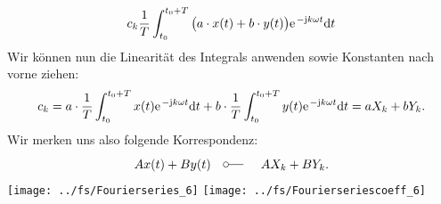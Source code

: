 \documentclass[11pt,a4paper,DIV=12]{scrartcl}
\newcommand{\diff}{\mathrm{d}}
\begin{document}
\begin{align}
	c_k\frac{1}{T}\int_{t_0}^{t_0+T}\big (a\cdot x(t)+b\cdot y(t)\big )\e^{-\im k \omega t}\diff t
\end{align}
Wir können nun die Linearität des Integrals anwenden sowie Konstanten nach vorne ziehen:
\begin{align}
	c_k=a\cdot\frac{1}{T}\int_{t_0}^{t_0+T}x(t)\e^{-\im k \omega t}\diff t+b\cdot\frac{1}{T}\int_{t_0}^{t_0+T}y(t)\e^{-\im k \omega t}\diff t=aX_k+bY_k.
\end{align}
Wir merken uns also folgende Korrespondenz:
\begin{align}
	Ax(t)+By(t)\quad\fourier\quad AX_k+BY_k.
\end{align}
\newpage
\texttt{[image: ../fs/Fourierseries\_6]}
\texttt{[image: ../fs/Fourierseriescoeff\_6]}
\newpage
\end{document}
